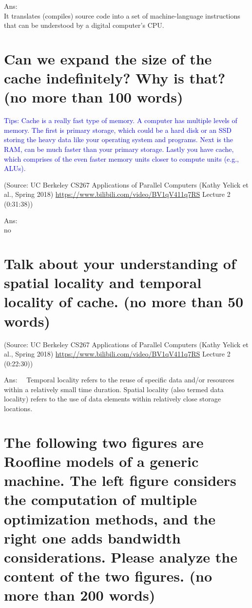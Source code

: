 \documentclass{article}
\begin{document}
Ans:%
~\\ It translates (compiles) source code  into a set of machine-language instructions that can be understood by a digital computer's CPU.
\section{Can we expand the size of the cache indefinitely? Why is that? (no more than 100 words)}
\textcolor{blue}{Tips: Cache is a really fast type of memory. A computer has multiple levels of memory. The first is primary storage, which could be a hard disk or an SSD storing the heavy data like your operating system and programs. Next is the RAM, can be much faster than your primary storage. Lastly you have cache, which comprises of the even faster memory units closer to compute units (e.g., ALUs).}

(Source: UC Berkeley CS267 Applications of Parallel Computers (Kathy Yelick et al., Spring 2018) \url{https://www.bilibili.com/video/BV1qV411q7RS} Lecture 2 (0:31:38))

Ans:%
~\\
no
\section{Talk about your understanding of spatial locality and temporal locality of cache. (no more than 50 words)}
(Source: UC Berkeley CS267 Applications of Parallel Computers (Kathy Yelick et al., Spring 2018) \url{https://www.bilibili.com/video/BV1qV411q7RS} Lecture 2 (0:22:30))

Ans:%
~\ Temporal locality refers to the reuse of specific data and/or resources within a relatively small time duration. Spatial locality (also termed data locality) refers to the use of data elements within relatively close storage locations.\
\section{The following two figures are Roofline models of a generic machine. The left figure considers the computation of multiple optimization methods, and the right one adds bandwidth considerations. Please analyze the content of the two figures. (no more than 200 words)}
\end{document}
